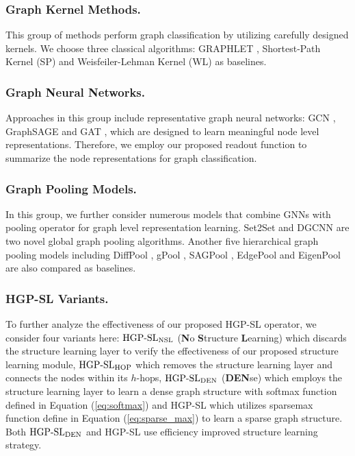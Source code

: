 \documentclass[letterpaper]{article} \usepackage{aaai20}  \usepackage{times}  \usepackage{helvet} \usepackage{courier}  \usepackage[hyphens]{url}  \usepackage{graphicx} \urlstyle{rm} \def\UrlFont{\rm}  \usepackage{graphicx}  \frenchspacing  \setlength{\pdfpagewidth}{8.5in}  \setlength{\pdfpageheight}{11in}
\begin{document}
\subsubsection{Graph Kernel Methods.}
This group of methods perform graph classification by utilizing carefully designed kernels. We choose three classical algorithms: GRAPHLET \cite{shervashidze2009efficient}, Shortest-Path Kernel (SP) \cite{borgwardt2005shortest} and Weisfeiler-Lehman Kernel (WL) \cite{shervashidze2011weisfeiler} as baselines.
\subsubsection{Graph Neural Networks.}
Approaches in this group include representative graph neural networks: GCN \cite{kipf2016semi}, GraphSAGE \cite{hamilton2017inductive} and GAT \cite{velivckovic2017graph}, which are designed to learn meaningful node level representations. Therefore, we employ our proposed readout function to summarize the node representations for graph classification.
\subsubsection{Graph Pooling Models.}
In this group, we further consider numerous models that combine GNNs with pooling operator for graph level representation learning. Set2Set \cite{vinyals2015order} and DGCNN \cite{zhang2018end} are two novel global graph pooling algorithms. Another five hierarchical graph pooling models including DiffPool \cite{ying2018hierarchical}, gPool \cite{gao2019graph}, SAGPool \cite{lee2019self}, EdgePool \cite{diehl2019edge} and EigenPool \cite{ma2019graph} are also compared as baselines. 
\subsubsection{HGP-SL Variants.}
To further analyze the effectiveness of our proposed HGP-SL operator, we consider four variants here: $\text{HGP-SL}_{{\rm NSL}}$ (\textbf{N}o \textbf{S}tructure \textbf{L}earning) which discards the structure learning layer to verify the effectiveness of our proposed structure learning module, $\text{HGP-SL}_{{\rm HOP}}$ which removes the structure learning layer and connects the nodes within its $h$-hops, $\text{HGP-SL}_{{\rm DEN}}$ (\textbf{DEN}se) which employs the structure learning layer to learn a dense graph structure with softmax function defined in Equation (\ref{eq:softmax}) and HGP-SL which utilizes sparsemax function define in Equation (\ref{eq:sparse_max}) to learn a sparse graph structure. Both $\text{HGP-SL}_{{\rm DEN}}$ and HGP-SL use efficiency improved structure learning strategy.
\end{document}

